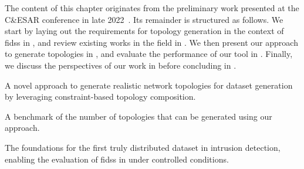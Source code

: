 The content of this chapter originates from the preliminary work presented at the C\&ESAR conference in late 2022~\cite{lavaur_cesar_2022}.
Its remainder is structured as follows.
We start by laying out the requirements for topology generation in the context of \glspl{fids} in , and review existing works in the field in .
We then present our approach to generate topologies in , and evaluate the performance of our tool in .
Finally, we discuss the perspectives of our work in  before concluding in .

\begin{contribs}
  \item A novel approach to generate realistic network topologies for dataset generation by leveraging constraint-based topology composition.
  \item A benchmark of the number of topologies that can be generated using our approach.
  \item The foundations for the first truly distributed dataset in intrusion detection, enabling the evaluation of \glspl{fids} in under controlled conditions.
\end{contribs}
